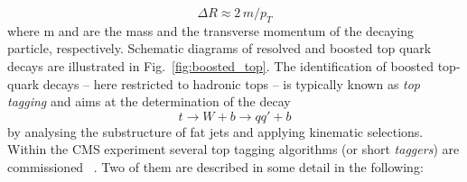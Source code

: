 \begin{equation}
 \Delta R \approx 2\,m /p_{T}
\end{equation}  
where m and \pt are the mass and the transverse momentum of the decaying particle, respectively. Schematic diagrams of resolved and boosted top quark decays are illustrated in Fig.~\ref{fig:boosted_top}. The identification of boosted top-quark decays -- here restricted to hadronic tops -- is typically known as \textit{top tagging} and aims at the determination of the decay
\begin{equation}
 t \rightarrow W + b \rightarrow qq' + b 
\end{equation} 
by analysing the substructure of fat jets and applying kinematic selections. \\ 
Within the CMS experiment several top tagging algorithms (or short \textit{taggers}) are commissioned~\cite{CMS:2014fya} . Two of them are described in some detail in the following:

